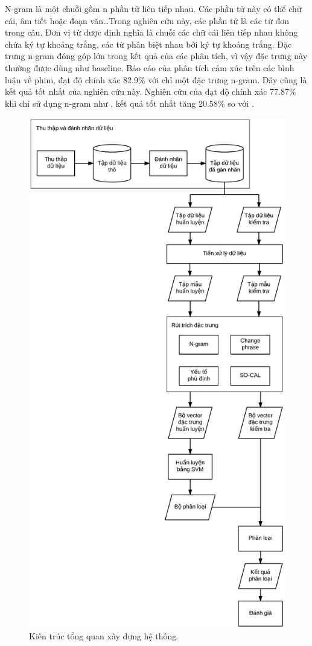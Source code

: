 N-gram là một chuỗi gồm n phần tử liên tiếp nhau. Các phần tử này có thể chữ cái, âm tiết hoặc đoạn văn\ldots Trong nghiên cứu này, các phần tử là các từ đơn trong câu. Đơn vị từ được định nghĩa là chuỗi các chữ cái liên tiếp nhau không chứa ký tự khoảng trắng, các từ phân biệt nhau bởi ký tự khoảng trắng. Đặc trưng n-gram đóng góp lớn trong kết quả của các phân tích, vì vậy đặc trưng này thường được dùng như baseline. Báo cáo  của \cite{pang2002thumbs} phân tích cảm xúc trên các bình luận về phim, đạt độ chính xác 82.9\% với chỉ một đặc trưng n-gram. Đây cũng là kết quả tốt nhất của nghiên cứu này. Nghiên cứu của \cite{niu2005analysis} đạt độ chính xác 77.87\% khi chỉ sử dụng n-gram như , kết quả tốt nhất tăng 20.58\% so với .
\begin{figure}[H]
\centering
\includegraphics[scale=0.3]{../hinh/Tongquan.png}
\caption{Kiến trúc tổng quan xây dựng hệ thống} \label{fig:tong-quan-xay-dung-he-thong}
\end{figure}
